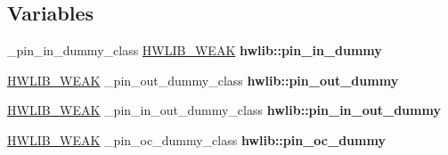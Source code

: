 \subsection*{Variables}
\begin{DoxyCompactItemize}
\item 
\+\_\+pin\+\_\+in\+\_\+dummy\+\_\+class \hyperlink{hwlib-defines_8hpp_a04be4340016df60d6636c1d1c6d94fc9}{H\+W\+L\+I\+B\+\_\+\+W\+E\+AK} {\bfseries hwlib\+::pin\+\_\+in\+\_\+dummy}\hypertarget{hwlib-pin-dummies_8hpp_af4a61043143177f6af8e0284e4524433}{}\label{hwlib-pin-dummies_8hpp_af4a61043143177f6af8e0284e4524433}

\item 
\hyperlink{hwlib-defines_8hpp_a04be4340016df60d6636c1d1c6d94fc9}{H\+W\+L\+I\+B\+\_\+\+W\+E\+AK} \+\_\+pin\+\_\+out\+\_\+dummy\+\_\+class {\bfseries hwlib\+::pin\+\_\+out\+\_\+dummy}\hypertarget{hwlib-pin-dummies_8hpp_acaf0b10a2f1c9765e1b91a98453adb20}{}\label{hwlib-pin-dummies_8hpp_acaf0b10a2f1c9765e1b91a98453adb20}

\item 
\hyperlink{hwlib-defines_8hpp_a04be4340016df60d6636c1d1c6d94fc9}{H\+W\+L\+I\+B\+\_\+\+W\+E\+AK} \+\_\+pin\+\_\+in\+\_\+out\+\_\+dummy\+\_\+class {\bfseries hwlib\+::pin\+\_\+in\+\_\+out\+\_\+dummy}\hypertarget{hwlib-pin-dummies_8hpp_a166a4bea8640903b2141ede3e703eb60}{}\label{hwlib-pin-dummies_8hpp_a166a4bea8640903b2141ede3e703eb60}

\item 
\hyperlink{hwlib-defines_8hpp_a04be4340016df60d6636c1d1c6d94fc9}{H\+W\+L\+I\+B\+\_\+\+W\+E\+AK} \+\_\+pin\+\_\+oc\+\_\+dummy\+\_\+class {\bfseries hwlib\+::pin\+\_\+oc\+\_\+dummy}\hypertarget{hwlib-pin-dummies_8hpp_a297be6e8b97db1f338641a5d2864e741}{}\label{hwlib-pin-dummies_8hpp_a297be6e8b97db1f338641a5d2864e741}

\end{DoxyCompactItemize}
